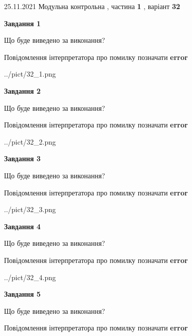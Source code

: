 \documentclass[10pt, ukrainian]{article}
\begin{document}
{25.11.2021 Модульна контрольна , частина \textbf { 1 }, варіант  \No \textbf { 32 }\par}
{
\begin {large}

{\begin {center}\textbf{Завдання 1}\end {center}}\par
Що буде виведено за виконання? \par
Повідомлення інтерпретатора про помилку позначати \textbf{error}

\begin{center}
	{../pict/32_1.png}
\end{center}
\newpage

{\begin {center}\textbf{Завдання 2}\end {center}}\par
Що буде виведено за виконання? \par
Повідомлення інтерпретатора про помилку позначати \textbf{error}

\begin{center}
	{../pict/32_2.png}
\end{center}
\newpage

{\begin {center}\textbf{Завдання 3}\end {center}}\par
Що буде виведено за виконання? \par
Повідомлення інтерпретатора про помилку позначати \textbf{error}

\begin{center}
	{../pict/32_3.png}
\end{center}
\newpage

{\begin {center}\textbf{Завдання 4}\end {center}}\par
Що буде виведено за виконання? \par
Повідомлення інтерпретатора про помилку позначати \textbf{error}

\begin{center}
	{../pict/32_4.png}
\end{center}
\newpage

{\begin {center}\textbf{Завдання 5}\end {center}}\par
Що буде виведено за виконання? \par
Повідомлення інтерпретатора про помилку позначати \textbf{error}


\end{large}}
\end{document}
